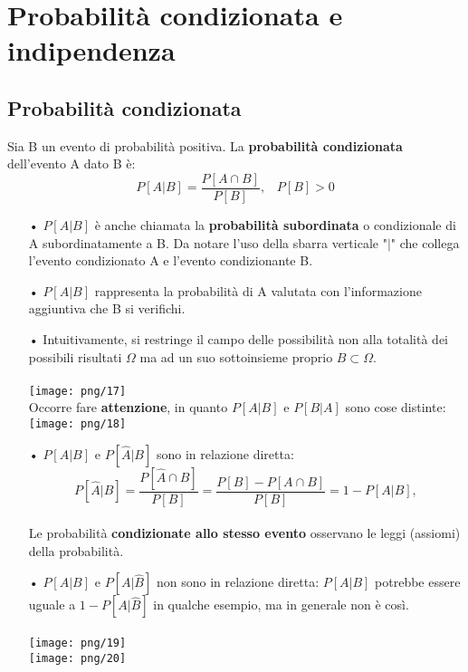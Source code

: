 \documentclass[12pt, letterpaper]{article}
\begin{document}
\newpage

\section{Probabilità condizionata e indipendenza}

\subsection{Probabilità condizionata}

Sia B un evento di probabilità positiva. La \textbf{probabilità condizionata} dell'evento A dato B è:
\\
$$P[A|B] = \frac{P[A\cap B]}{P[B]},\;\;\; P[B] > 0 $$

\begin{itemize}
   \item[•] $P [A|B]$ è anche chiamata la \textbf{probabilità subordinata} o condizionale
            di A subordinatamente a B. Da notare l’uso della sbarra verticale "$| $" che collega l’evento condizionato A e l'evento condizionante B.
   \item[•] $P[A|B]$ rappresenta la probabilità di A valutata con l'informazione aggiuntiva che B si verifichi.
   \item[•] Intuitivamente, si restringe il campo delle possibilità non alla totalità
            dei possibili risultati $\Omega$ ma ad un suo sottoinsieme proprio $B \subset \Omega$.
            \\\\\texttt{[image: png/17]}\\
            \newpage
            Occorre fare \textbf{attenzione}, in quanto $P[A|B]$ e $P[B|A]$ sono cose distinte:
            \\\texttt{[image: png/18]}\\
   \item[•] $P[A|B]$ e $P[\hat{A}|B]$ sono in relazione diretta:
            $$P[\hat{A}|B] = \frac{P[\hat{A}\cap B]}{P[B]} = \frac{P[B] - P[A\cap B]}{P[B]} = 1-P[A|B],$$
            \\
            Le probabilità \textbf{condizionate allo stesso evento} osservano le leggi (assiomi) della probabilità.
   \item[•] $P[A|B]$ e $P[A|\hat{B}]$ non sono in relazione diretta: $P[A|B]$ potrebbe essere uguale a 
            $1-P[A|\hat{B}]$ in qualche esempio, ma in generale non è così.\\
            \\\texttt{[image: png/19]}\\
            \texttt{[image: png/20]}\\
\end{itemize}
\end{document}
